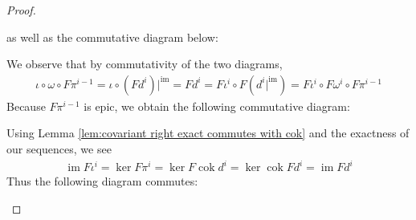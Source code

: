 \documentclass{article}
\DeclareMathOperator{\im}{im}
\DeclareMathOperator{\cok}{cok}
\begin{document}
\begin{proof}
\begin{enumerate}[(a)]
\begin{center}
   \end{center}
   as well as the commutative diagram below:
   \begin{center}
   \end{center}
   We observe that by commutativity of the two diagrams,
   \begin{align*}
       \iota \circ \omega \circ F\pi^{i-1}=\iota \circ (Fd^i)\vert^{\im}=Fd^i=F\iota^i\circ F(d^i\vert^{\im})=F\iota^i\circ F\omega^i\circ F\pi^{i-1}
   \end{align*}
   Because $F\pi^{i-1}$ is epic, we obtain the following commutative diagram:
   \begin{center}
   \end{center}
   Using Lemma \ref{lem:covariant right exact commutes with cok} and the exactness of our sequences, we see
\begin{align*}
    \im F\iota^i=\ker F\pi^i=\ker F\cok d^i=\ker \cok F d^i=\im Fd^i
\end{align*}
   Thus the following diagram commutes:
   \begin{center}
\end{center}
\end{enumerate}
\end{proof}
\end{document}
